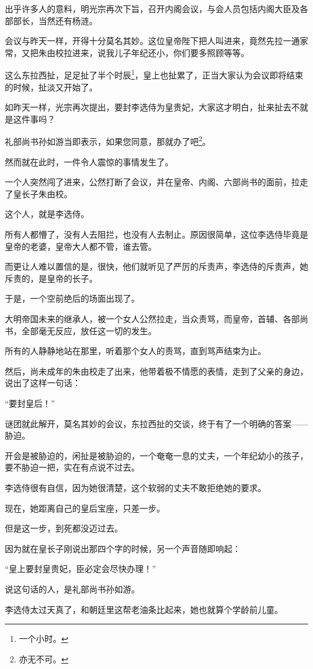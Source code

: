 \begin{multicols}{\theparacolNo}
出乎许多人的意料，明光宗再次下旨，召开内阁会议，与会人员包括内阁大臣及各部部长，当然还有杨涟。

会议与昨天一样，开得十分莫名其妙。这位皇帝陛下把人叫进来，竟然先拉一通家常，又把朱由校拉进来，说我儿子年纪还小，你们要多照顾等等。

这么东拉西扯，足足扯了半个时辰\footnote{一个小时。}，皇上也扯累了，正当大家认为会议即将结束的时候，扯淡又开始了。

如昨天一样，光宗再次提出，要封李选侍为皇贵妃，大家这才明白，扯来扯去不就是这件事吗？

礼部尚书孙如游当即表示，如果您同意，那就办了吧\footnote{亦无不可。}。

然而就在此时，一件令人震惊的事情发生了。

一个人突然闯了进来，公然打断了会议，并在皇帝、内阁、六部尚书的面前，拉走了皇长子朱由校。

这个人，就是李选侍。

所有人都懵了，没有人去阻拦，也没有人去制止。原因很简单，这位李选侍毕竟是皇帝的老婆，皇帝大人都不管，谁去管。

而更让人难以置信的是，很快，他们就听见了严厉的斥责声，李选侍的斥责声，她斥责的，是皇帝的长子。

于是，一个空前绝后的场面出现了。

大明帝国未来的继承人，被一个女人公然拉走，当众责骂，而皇帝，首辅、各部尚书，全部毫无反应，放任这一切的发生。

所有的人静静地站在那里，听着那个女人的责骂，直到骂声结束为止。

然后，尚未成年的朱由校走了出来，他带着极不情愿的表情，走到了父亲的身边，说出了这样一句话：

“要封皇后！”

谜团就此解开，莫名其妙的会议，东拉西扯的交谈，终于有了一个明确的答案——胁迫。

开会是被胁迫的，闲扯是被胁迫的，一个奄奄一息的丈夫，一个年纪幼小的孩子，要不胁迫一把，实在有点说不过去。

李选侍很有自信，因为她很清楚，这个软弱的丈夫不敢拒绝她的要求。

现在，她距离自己的皇后宝座，只差一步。

但是这一步，到死都没迈过去。

因为就在皇长子刚说出那四个字的时候，另一个声音随即响起：

“皇上要封皇贵妃，臣必定会尽快办理！”

说这句话的人，是礼部尚书孙如游。

李选侍太过天真了，和朝廷里这帮老油条比起来，她也就算个学龄前儿童。


\end{multicols}

